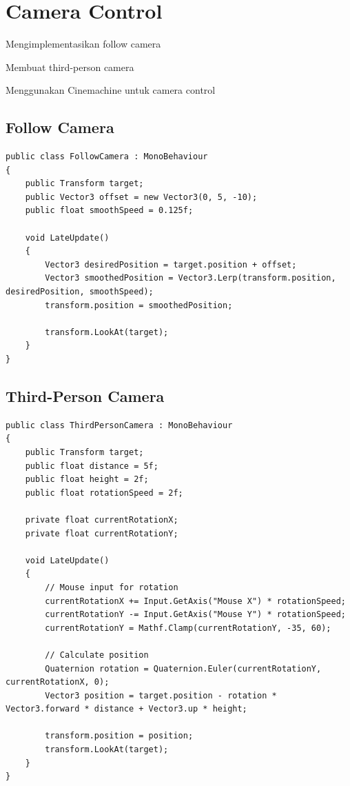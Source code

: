 
\section{Camera Control}

\begin{learningoutcomes}
\item Mengimplementasikan follow camera
\item Membuat third-person camera
\item Menggunakan Cinemachine untuk camera control
\end{learningoutcomes}

\subsection{Follow Camera}

\begin{lstlisting}[language={[Sharp]C}]
public class FollowCamera : MonoBehaviour
{
    public Transform target;
    public Vector3 offset = new Vector3(0, 5, -10);
    public float smoothSpeed = 0.125f;
    
    void LateUpdate()
    {
        Vector3 desiredPosition = target.position + offset;
        Vector3 smoothedPosition = Vector3.Lerp(transform.position, desiredPosition, smoothSpeed);
        transform.position = smoothedPosition;
        
        transform.LookAt(target);
    }
}
\end{lstlisting}

\subsection{Third-Person Camera}

\begin{lstlisting}[language={[Sharp]C}]
public class ThirdPersonCamera : MonoBehaviour
{
    public Transform target;
    public float distance = 5f;
    public float height = 2f;
    public float rotationSpeed = 2f;
    
    private float currentRotationX;
    private float currentRotationY;
    
    void LateUpdate()
    {
        // Mouse input for rotation
        currentRotationX += Input.GetAxis("Mouse X") * rotationSpeed;
        currentRotationY -= Input.GetAxis("Mouse Y") * rotationSpeed;
        currentRotationY = Mathf.Clamp(currentRotationY, -35, 60);
        
        // Calculate position
        Quaternion rotation = Quaternion.Euler(currentRotationY, currentRotationX, 0);
        Vector3 position = target.position - rotation * Vector3.forward * distance + Vector3.up * height;
        
        transform.position = position;
        transform.LookAt(target);
    }
}
\end{lstlisting}

